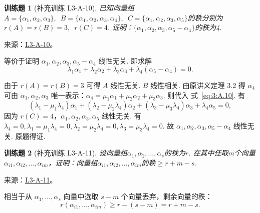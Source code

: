 \documentclass[12pt,fontset=fandol]{ctexart}
\newtheorem{exercise}{训练题}[section]
\begin{document}
\begin{exercise}[补充训练 L3-A-10]\label{prob:L3-A-10}
已知向量组$A=\{\alpha_1,\alpha_2,\alpha_3\},\enspace B=\{\alpha_1,\alpha_2,\alpha_3,\alpha_4\},\enspace C=\{\alpha_1,\alpha_2,\alpha_3,\alpha_5\}$的秩分别为$r(A)=r(B)=3,\enspace r(C)=4$. 证明：$\{\alpha_1,\alpha_2,\alpha_3,\alpha_5-\alpha_4\}$的秩为4.
\end{exercise}
\noindent 来源：\href{https://github.com/yhwu-is/Linear-Algebra-Left-Undone/blob/new/%E8%AE%B2%E4%B9%89/%E4%B8%93%E9%A2%98/3%20%E6%9C%89%E9%99%90%E7%BB%B4%E7%BA%BF%E6%80%A7%E7%A9%BA%E9%97%B4.tex}{L3-A-10}。
\begin{solve}
等价于证明 $\alpha_1,\alpha_2,\alpha_3,\alpha_5-\alpha_4$ 线性无关. 即求解
            \begin{equation}
                \lambda_1\alpha_1+\lambda_2\alpha_2+\lambda_3\alpha_3+\lambda_4(\alpha_5-\alpha_4)=0. \tag{*} \label{eq:3:A.10}
            \end{equation}

            由于 $r(A)=r(B)=3$ 可得 $A$ 线性无关. $B$ 线性相关. 由原讲义定理 3.2 得 $\alpha_4$ 可由 $\alpha_1,\alpha_2,\alpha_3$ 唯一表示：$\alpha_4=\mu_1\alpha_1+\mu_2\alpha_2+\mu_3\alpha_3$. 则代入 式~\eqref{eq:3:A.10}. 有
            \[(\lambda_1-\mu_1\lambda_4)\alpha_1+(\lambda_2-\mu_2\lambda_4)\alpha_2+(\lambda_3-\mu_3\lambda_4)\alpha_3+\lambda_4\alpha_5=0,\]
            因为 $r(C)=4$，$\alpha_1,\alpha_2,\alpha_3,\alpha_5$ 线性无关. 有 $\lambda_4=0,\lambda_1=\mu_1\lambda_4=0,\lambda_2=\mu_2\lambda_4=0,\lambda_3=\mu_3\lambda_4=0$. 故 $\alpha_1,\alpha_2,\alpha_3,\alpha_5-\alpha_4$ 线性无关. 原题得证.
\end{solve}

\begin{exercise}[补充训练 L3-A-11]\label{prob:L3-A-11}
设向量组$\alpha_1,\alpha_2,\ldots,\alpha_s$的秩为$r$. 在其中任取$m$个向量$\alpha_{i1},\alpha_{i2},\ldots,\alpha_{im}$，证明：向量组$\alpha_{i1},\alpha_{i2},\ldots,\alpha_{im}$的秩$\geqslant r+m-s$.
\end{exercise}
\noindent 来源：\href{https://github.com/yhwu-is/Linear-Algebra-Left-Undone/blob/new/%E8%AE%B2%E4%B9%89/%E4%B8%93%E9%A2%98/3%20%E6%9C%89%E9%99%90%E7%BB%B4%E7%BA%BF%E6%80%A7%E7%A9%BA%E9%97%B4.tex}{L3-A-11}。
\begin{solve}
相当于从 $\alpha_1,\ldots,\alpha_s$ 向量中选取 $s-m$ 个向量丢弃，剩余向量的秩：
            \[r(\alpha_{i1},\ldots,\alpha_{im})\geqslant r-(s-m) =r+m-s.\]
\end{solve}
\end{document}
